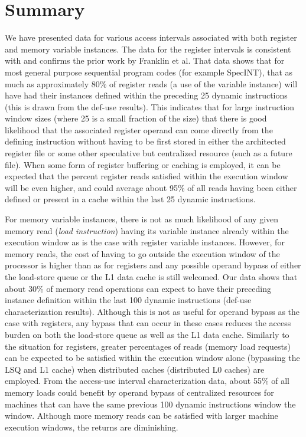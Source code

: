 \documentclass[10pt,dvips]{article}
\begin{document}
\section{Summary}
%
We have presented data for various access intervals associated
with both register and memory variable instances.
The data for the register intervals is consistent with and
confirms the prior work by Franklin et al.
That data shows that for most general purpose sequential program
codes (for example SpecINT), that as much as approximately
80\% of register reads (a use
of the variable instance) will have had their instances defined within
the preceding 25 dynamic instructions (this is drawn from the def-use
results).  
This indicates
that for large instruction window sizes (where 25 is a small fraction of
the size) that there is good likelihood that the associated register
operand can come directly from the defining instruction without
having to be first stored in either the architected register
file or some other speculative but 
centralized resource (such as a future file).
When some form of register buffering or caching is employed, it
can be expected that the percent register reads satisfied within
the execution window will be even higher, and could average about 95\%
of all reads having been either defined or present in a cache within
the last 25 dynamic instructions.

For memory variable instances, there is not as much likelihood
of any given memory read (\textit{load instruction}) having its
variable instance already within the execution window as is the
case with register variable instances.
However, for memory reads, the cost of having to go outside
the execution window of the processor is higher than as for registers
and any possible
operand bypass of either the load-store queue or the
L1 data cache is still welcomed.
Our data shows that about 30\% of memory read operations
can expect to have their preceding instance definition within
the last 100 dynamic instructions (def-use characterization results).
Although this is not as useful for operand bypass as the case with
registers, any bypass that can occur in these cases reduces the
access burden on both the load-store queue as well as the L1
data cache.
Similarly to the situation for registers, greater percentages of reads
(memory load requests) can be expected to be satisfied within
the execution window alone (bypassing the LSQ and L1 cache)
when distributed caches (distributed L0 caches) are employed.
From the access-use interval characterization data, about 55\% of
all memory loads could benefit by operand bypass of centralized
resources for machines that can have the same previous 100
dynamic instructions window the window.
Although more memory reads can be satisfied with larger machine
execution windows, the returns are diminishing.
\end{document}
